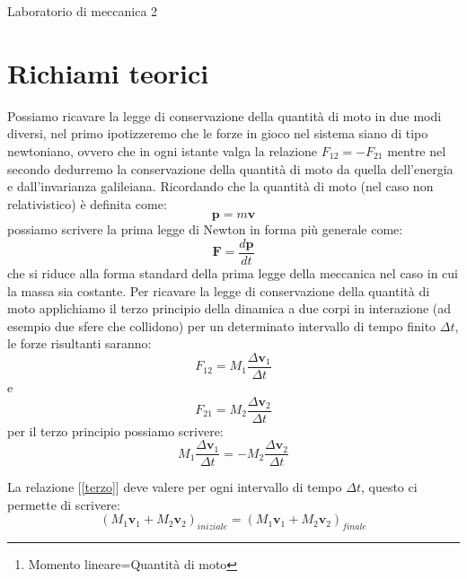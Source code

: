 \documentclass[a4paper,10pt,oneside]{article}
\begin{document}
\begin{center}
{\huge Laboratorio di  meccanica 2}
\end{center}


\begin{abstract}
Durante questo laboratorio analizzeremo il principio di conservazione della quantità di moto e tramite degli esperimenti cercheremo di vedere come in assenza di forze esterne il momento lineare sia costante \footnote{Momento lineare=Quantità di moto}.
\end{abstract}


\section{Richiami teorici}
Possiamo ricavare la legge di conservazione della quantità di moto in due modi diversi, nel primo ipotizzeremo che le forze in gioco nel sistema siano di tipo newtoniano, ovvero che in ogni istante valga la relazione $F_{12}=-F_{21}$ mentre nel secondo dedurremo la conservazione della quantità di moto da quella dell'energia e dall'invarianza galileiana.
Ricordando che la quantità di moto (nel caso non relativistico) è definita come:
\begin{equation}
 \mathbf{p}=m\mathbf{v}
\end{equation}
possiamo scrivere la prima legge di Newton in forma più generale come:
\begin{equation}
 \mathbf{F}=\frac{d\mathbf{p}}{dt}
\end{equation}
che si riduce alla forma standard della prima legge della meccanica nel caso in cui la massa sia costante.
Per ricavare la legge di conservazione della quantità di moto applichiamo il terzo principio della dinamica a due corpi in interazione (ad esempio due sfere che collidono) per un determinato intervallo di tempo finito $\Delta t$, le forze risultanti saranno:
\begin{equation}
 F_{12}=M_1\frac{\Delta \mathbf{v}_1}{\Delta t}
\end{equation}
e 
\begin{equation}
 F_{21}=M_2\frac{\Delta \mathbf{v}_2}{\Delta t}
\end{equation}
per il terzo principio possiamo scrivere:
\begin{equation}\label{terzo}
 M_1\frac{\Delta \mathbf{v}_1}{\Delta t}=-M_2\frac{\Delta \mathbf{v}_2}{\Delta t}
\end{equation}

La relazione [\ref{terzo}] deve valere per ogni intervallo di tempo $\Delta t$, questo ci permette di scrivere:
\begin{equation}\label{princ}
 (M_1\mathbf{v}_1+M_2\mathbf{v}_2)_{iniziale}=(M_1\mathbf{v}_1+M_2\mathbf{v}_2)_{finale}
\end{equation}
\end{document}
